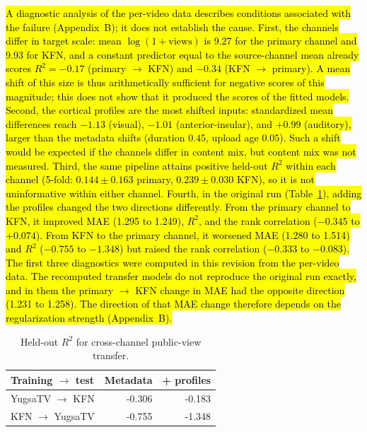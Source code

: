 \documentclass{ieeeaccess}
\newcommand{\rev}[1]{\hl{#1}}
\newcommand{\rev}[1]{#1}
\begin{document}
\rev{A diagnostic analysis of the per-video data describes conditions associated with the failure (Appendix~B); it does not establish the cause. First, the channels differ in target scale: mean $\log(1+\text{views})$ is 9.27 for the primary channel and 9.93 for KFN, and a constant predictor equal to the source-channel mean already scores $R^2=-0.17$ (primary $\rightarrow$ KFN) and $-0.34$ (KFN $\rightarrow$ primary). A mean shift of this size is thus arithmetically sufficient for negative scores of this magnitude; this does not show that it produced the scores of the fitted models. Second, the cortical profiles are the most shifted inputs: standardized mean differences reach $-1.13$ (visual), $-1.01$ (anterior-insular), and $+0.99$ (auditory), larger than the metadata shifts (duration $0.45$, upload age $0.05$). Such a shift would be expected if the channels differ in content mix, but content mix was not measured. Third, the same pipeline attains positive held-out $R^2$ within each channel (5-fold: $0.144\pm0.163$ primary, $0.239\pm0.030$ KFN), so it is not uninformative within either channel. Fourth, in the original run (\mbox{Table~\ref{tab:transfer}}), adding the profiles changed the two directions differently. From the primary channel to KFN, it improved MAE (1.295 to 1.249), $R^2$, and the rank correlation ($-0.345$ to $+0.074$). From KFN to the primary channel, it worsened MAE (1.280 to 1.514) and $R^2$ ($-0.755$ to $-1.348$) but raised the rank correlation ($-0.333$ to $-0.083$). The first three diagnostics were computed in this revision from the per-video data. The recomputed transfer models do not reproduce the original run exactly, and in them the primary $\rightarrow$ KFN change in MAE had the opposite direction (1.231 to 1.258). The direction of that MAE change therefore depends on the regularization strength (Appendix~B).}

\begin{table}[t]
\caption{Held-out $R^2$ for cross-channel public-view transfer.}
\label{tab:transfer}
\centering
\renewcommand{\arraystretch}{1.1}
\tablebodyfont
\begin{tabular}{@{}lrr@{}}
\toprule
Training $\rightarrow$ test & Metadata & + profiles \\
\midrule
YugsaTV $\rightarrow$ KFN & -0.306 & -0.183 \\
KFN $\rightarrow$ YugsaTV & -0.755 & -1.348 \\
\bottomrule
\end{tabular}
\end{table}
\end{document}
